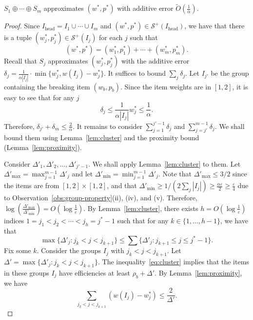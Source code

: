 \documentclass[a4paper,UKenglish,cleveref, autoref, thm-restate, pdfa]{lipics-v2021}
\newcommand{\eps}{\varepsilon}
\renewcommand{\leq}{\leqslant}
\renewcommand{\geq}{\geqslant}
\begin{document}
\begin{lemma}
    $S_1 \oplus \cdots \oplus S_m$ approximates $(w^*, p^*)$ with additive error $\tilde{O}(\frac{1}{\alpha})$.
\end{lemma}
\begin{proof}
    Since $I_{\mathrm{head}} = I_1 \cup \cdots \cup I_m$ and $(w^*, p^*) \in \mathcal{S}^+(I_{\mathrm{head}})$, we have that there is a tuple $(w^*_j, p^*_j) \in \mathcal{S}^+(I_j)$ for each $j$ such that 
    \[
        (w^*, p^*) = (w^*_1, p^*_1) + \cdots + (w^*_m, p^*_m).
    \]
    Recall that $S_j$ approximates $(w^*_j, p^*_j)$ with the additive error $\delta_j = \frac{1}{\alpha|I_j|}\cdot\min\{w^*_j,w(I_j)-w^*_j\}$. It suffices to bound $\sum_j \delta_j$. Let $I_{j'}$ be the group containing the breaking item $(w_b, p_b)$. Since the item weights are in $[1,2]$, it is easy to see that for any $j$
    \[
        \delta_{j} \leq \frac{1}{\alpha|I_{j}|}w^*_{j} \leq \frac{1}{\alpha}.
    \]
    Therefore, $\delta_{j'} + \delta_{m} \leq \frac{2}{\alpha}$. It remains to consider $\sum_{j = 1}^{j'-1} \delta_j$ and $\sum_{j = j'}^{m-1} \delta_j$. We shall bound them using Lemma~\ref{lem:cluster} and the proximity bound (Lemma~\ref{lem:proximity}).

    Consider $\Delta'_1, \Delta'_2, \ldots, \Delta'_{j'-1}$. We shall apply Lemma~\ref{lem:cluster} to them. Let $\Delta'_{\max} = \max_{j=1}^{m-1}\Delta'_j$ and let $\Delta'_{\min} = \min_{j=1}^{m-1}\Delta'_j$.  Note that $\Delta'_{\max} \leq 3/2$ since the items are from $[1,2] \times [1,2]$, and that \(
    \Delta'_{\min} \geq 1/(2\sum_j |I_j|) \geq  \frac{\alpha\eps}{2} \geq \frac{\eps}{4}
    \) due to Observation~\ref{obs:group-property}(ii), (iv), and (v). Therefore, $\log(\frac{\Delta'_{\max}}{\Delta'_{\min}}) = O(\log \frac{1}{\eps})$.  By Lemma~\ref{lem:cluster}, there exists $h = O(\log \frac{1}{\eps})$ indices $1 = j_1 < j_2 < \cdots < j_h = j^* - 1$ such that for any $k \in \{1, \ldots, h-1\}$, we have that
    \begin{equation}\label{eq:cluster}
            \max\{\Delta'_j : j_k < j < j_{k+1}\} \leq \sum\{\Delta'_j : j_{k+1} \leq j \leq j^*-1\}.
   \end{equation}
   Fix some $k$. Consider the groups $I_j$ with $j_k < j < j_{k+1}$. Let $\Delta' = \max\{\Delta'_j : j_k < j < j_{k+1}\}$. The inequality~\eqref{eq:cluster} implies that the items in these groups $I_j$ have efficiencies at least $\rho_b + \Delta'$. By Lemma~\ref{lem:proximity}, we have 
   \begin{equation}\label{eq:proximity-bound-b}
        \sum_{j_k < j < j_{k+1}} (w(I_j) - w^*_j) \leq \frac{2}{\Delta'}.  
   \end{equation}


\end{proof}
\end{document}
